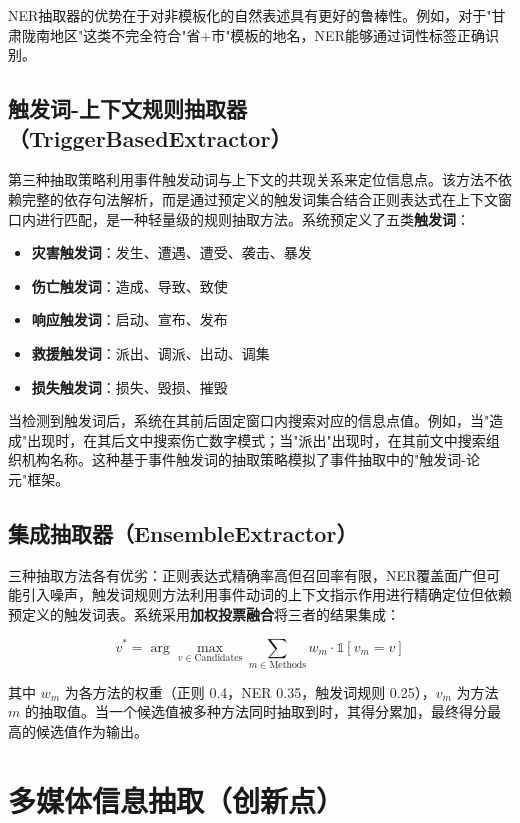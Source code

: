 \documentclass[12pt, a4paper]{ctexart}
\begin{document}
NER抽取器的优势在于对非模板化的自然表述具有更好的鲁棒性。例如，对于"甘肃陇南地区"这类不完全符合"省+市"模板的地名，NER能够通过词性标签正确识别。

\subsection{触发词-上下文规则抽取器（TriggerBasedExtractor）}

第三种抽取策略利用事件触发动词与上下文的共现关系来定位信息点。该方法不依赖完整的依存句法解析，而是通过预定义的触发词集合结合正则表达式在上下文窗口内进行匹配，是一种轻量级的规则抽取方法。系统预定义了五类\textbf{触发词}：

\begin{itemize}[itemsep=2pt]
    \item \textbf{灾害触发词}：发生、遭遇、遭受、袭击、暴发
    \item \textbf{伤亡触发词}：造成、导致、致使
    \item \textbf{响应触发词}：启动、宣布、发布
    \item \textbf{救援触发词}：派出、调派、出动、调集
    \item \textbf{损失触发词}：损失、毁损、摧毁
\end{itemize}

当检测到触发词后，系统在其前后固定窗口内搜索对应的信息点值。例如，当"造成"出现时，在其后文中搜索伤亡数字模式；当"派出"出现时，在其前文中搜索组织机构名称。这种基于事件触发词的抽取策略模拟了事件抽取中的"触发词-论元"框架。

\subsection{集成抽取器（EnsembleExtractor）}

三种抽取方法各有优劣：正则表达式精确率高但召回率有限，NER覆盖面广但可能引入噪声，触发词规则方法利用事件动词的上下文指示作用进行精确定位但依赖预定义的触发词表。系统采用\textbf{加权投票融合}将三者的结果集成：

\begin{equation}
    v^* = \arg\max_{v \in \text{Candidates}} \sum_{m \in \text{Methods}} w_m \cdot \mathbb{1}[v_m = v]
\end{equation}

其中 $w_m$ 为各方法的权重（正则 0.4，NER 0.35，触发词规则 0.25），$v_m$ 为方法 $m$ 的抽取值。当一个候选值被多种方法同时抽取到时，其得分累加，最终得分最高的候选值作为输出。


\section{多媒体信息抽取（创新点）}
\end{document}
